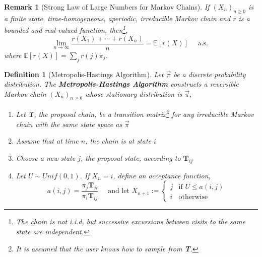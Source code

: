 \documentclass{tufte-handout}
\newtheorem{defn}[thm]{Definition}
\newtheorem{rmk}[thm]{Remark}
\begin{document}
  \begin{rmk}[Strong Law of Large Numbers for Markov Chains]
    If $(X_n)_{n \geq 0}$ is a finite state, time-homogeneous, aperiodic, irreducible Markov chain and $r$ is a bounded and real-valued function, then\footnote{The chain is not i.i.d, but successive excursions between visits to the same state are independent.},
    \[\lim_{n \rightarrow \infty} \frac{r(X_1)+ \cdots + r(X_n)}{n} = \mathbb{E}[r(X)] \quad \text{ a.s. }\]
    \noindent where $\mathbb{E}[r(X)] = \sum_j r(j) \pi_j$.
  \end{rmk}

  \begin{defn}[Metropolis-Hastings Algorithm]
    Let $\Vec{\pi}$ be a discrete probability distribution. The \textbf{Metropolis-Hastings Algorithm} constructs a reversible Markov chain $(X_n)_{n \geq 0}$ whose stationary distribution is $\Vec{\pi}$,
    \begin{enumerate}
      \item Let \textbf{T}, the proposal chain, be a transition matrix\footnote{It is assumed that the user knows how to sample from \textbf{T}.} for any irreducible Markov chain with the same state space as $\Vec{\pi}$
      \item Assume that at time $n$, the chain is at state $i$
      \item Choose a new state $j$, the proposal state, according to $\boldsymbol{T}_{ij}$
      \item Let $U \sim Unif(0,1)$. If $X_n = i$, define an acceptance function,
      \[
      a(i,j) = \frac{\pi_j\boldsymbol{T}_{ji}}{\pi_i\boldsymbol{T}_{ij}} \quad
      \text{ and let } X_{n+1} := \begin{cases}
        j & \text{if $U \leq a(i,j)$} \\
        i & \text{otherwise}
        \end{cases}
      \]
    \end{enumerate}
  \end{defn}
\end{document}
